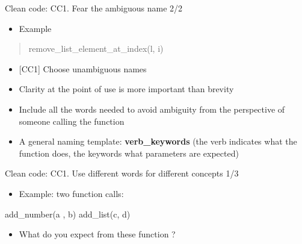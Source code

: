 \documentclass[
  8pt,
  ignorenonframetext,
]{beamer}
\newenvironment{Shaded}{\begin{snugshade}}{\end{snugshade}}
\newcommand{\NormalTok}[1]{#1}
\providecommand{\tightlist}{%
  \setlength{\itemsep}{0pt}\setlength{\parskip}{0pt}}
\begin{document}
\begin{frame}[fragile]{Clean code: CC1. Fear the ambiguous name 2/2}
\protect\hypertarget{clean-code-cc1.-fear-the-ambiguous-name-22}{}
\begin{itemize}[<+->]
\tightlist
\item
  Example
\end{itemize}

\begin{quote}
\begin{Shaded}
\begin{Highlighting}[]
\NormalTok{remove\_list\_element\_at\_index(l, i)}
\end{Highlighting}
\end{Shaded}
\end{quote}

\begin{itemize}[<+->]
\tightlist
\item
  {[}CC1{]} Choose unambiguous names
\end{itemize}

\begin{itemize}[<+->]
\tightlist
\item
  Clarity at the point of use is more important than brevity
\end{itemize}

\begin{itemize}[<+->]
\tightlist
\item
  Include all the words needed to avoid ambiguity from the perspective
  of someone calling the function
\end{itemize}

\begin{itemize}[<+->]
\tightlist
\item
  A general naming template: \textbf{verb\_keywords} (the verb indicates
  what the function does, the keywords what parameters are expected)
\end{itemize}
\end{frame}

\begin{frame}[fragile]{Clean code: CC1. Use different words for
different concepts 1/3}
\protect\hypertarget{clean-code-cc1.-use-different-words-for-different-concepts-13}{}
\begin{itemize}
\tightlist
\item
  Example: two function calls:
\end{itemize}

\begin{Shaded}
\begin{Highlighting}[]
\NormalTok{add\_number(a , b)}
\NormalTok{add\_list(c, d)}
\end{Highlighting}
\end{Shaded}

\begin{itemize}
\tightlist
\item
  What do you expect from these function ?
\end{itemize}
\end{frame}
\end{document}
